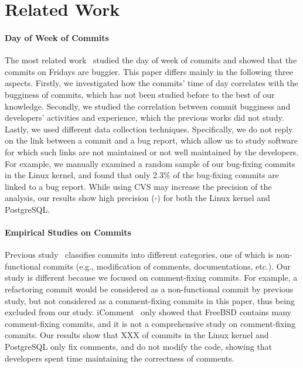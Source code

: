\section{Related Work}
\label{sec-related}

\paragraph{Day of Week of Commits}
The most related work~\cite{sliwerski-msr-2005} studied the day of week of commits and
showed that the commits on Fridays are buggier. 
This paper differs mainly in the following three aspects.
Firstly, we investigated how the commits' time of day correlates with the bugginess of commits, 
which has not been studied before to the best of our knowledge.
Secondly, we studied the correlation between commit bugginess and developers' activities and 
experience, which the previous works did not study.
Lastly, we used different data collection techniques. Specifically, we do not reply on the link 
between a commit and a bug report, which allow us to study software for which such links are 
not maintained or not well maintained by the developers. For example, we manually examined a random sample 
of our bug-fixing commits in the Linux kernel, and found that only 2.3\% of the bug-fixing commits
are linked to a bug report. 
While using CVS may increase the precision of the analysis, our results show high precision (\postP-\linuxP) 
for both the Linux kernel and PostgreSQL.

\paragraph{Empirical Studies on Commits}
Previous study~\cite{largeCommits} classifies commits into different categories, one of which 
is non-functional commits (e.g., modification of comments, documentations, etc.).
Our study is different because we focused on
comment-fixing commits. For example, a refactoring commit 
would be considered as a non-functional commit by previous study, but not considered as a comment-fixing commits in this paper, 
thus being excluded from our study. 
iComment~\cite{iComment} only showed that FreeBSD contains many comment-fixing commits, and it is 
not a comprehensive study on comment-fixing commits.  
Our results show that XXX of commits in the Linux kernel and PostgreSQL only fix comments, and do not modify the code, showing
that developers spent time maintaining the correctness of comments. 


